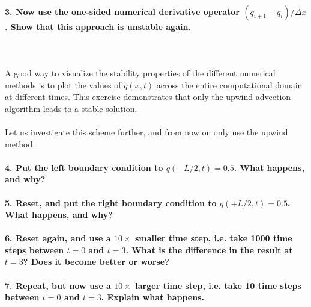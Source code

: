 \paragraph{3. Now use the one-sided numerical derivative 
    operator $(q_{i+1}-q_i)/\Delta x$. Show that this 
    approach is unstable again.
} \ \\
    \\
A good way to visualize the stability properties of the 
different numerical methods is to plot the values of 
$q(x,t)$ across the entire computational domain at 
different times. This exercise demonstrates that only the 
upwind advection algorithm leads to a stable solution. \\
\\
Let us investigate this scheme further, and from now on 
only use the upwind method.

\paragraph{4. Put the left boundary condition to 
    $q(-L/2,t)=0.5$. What happens, and why?
}

\paragraph{5. Reset, and put the right boundary condition 
    to $q(+L/2,t)=0.5$. What happens, and why?
}

\paragraph{6. Reset again, and use a $10\times$ smaller 
    time step, i.e. take 1000 time steps between $t=0$ and 
    $t=3$. What is the difference in the result at $t=3$? 
    Does it become better or worse?
}

\paragraph{7. Repeat, but now use a $10\times$ larger time 
    step, i.e. take 10 time steps between $t=0$ and $t=3$. 
    Explain what happens.
}

